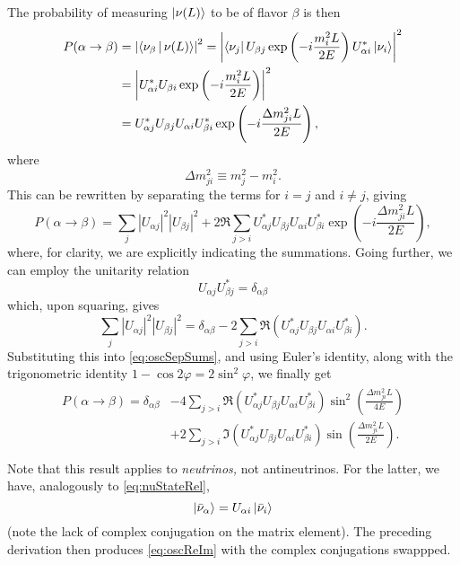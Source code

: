 \documentclass[../thesis.tex]{subfiles}
\begin{document}
The probability of measuring $\ket{\nu(L)}$ to be of flavor $\beta$ is then
\begin{align*}
  P(\alpha \rightarrow \beta)
  &= \left|\Braket{\nu_\beta|\nu(L)}\right|^2
    = \left| \Bra{\nu_j} U_{\beta j} \exp\left( -i\frac{m_i^2L}{2E} \right) U^*_{\alpha i}\Ket{\nu_i}\right|^2 \\
  &=  \left| U^*_{\alpha i} U_{\beta i} \exp\left( -i \frac{m_i^2L}{2E} \right)\right|^2 \\
  &= U^*_{\alpha j} U_{\beta j} U_{\alpha i} U^*_{\beta i} \exp\left( -i \frac{\Delta m^2_{ji}L}{2E} \right),
\end{align*}
where
\begin{equation}
  \Delta m^2_{ji} \equiv m^2_j - m^2_i.
\end{equation}
This can be rewritten by separating the terms for \(i = j\) and \(i \neq j\), giving
\begin{equation}
  \label{eq:oscSepSums}
  P(\alpha \rightarrow \beta) = \sum_{j} |U_{\alpha j}|^2 |U_{\beta j}|^2
  + 2 \Re \sum_{j>i} U^*_{\alpha j} U_{\beta j} U_{\alpha i} U^*_{\beta i}
  \exp\left( -i \frac{\Delta m^2_{ji}L}{2E} \right),
\end{equation}
where, for clarity, we are explicitly indicating the summations. Going further, we can employ the unitarity relation
\begin{equation}
  U_{\alpha j} U^*_{\beta j} = \delta_{\alpha \beta}
\end{equation}
which, upon squaring, gives
\begin{equation}
  \sum_j |U_{\alpha j}|^2 |U_{\beta j}|^2 = \delta_{\alpha \beta}
  - 2 \sum_{j > i} \Re(U^*_{\alpha j} U_{\beta j} U_{\alpha i} U^*_{\beta i}).
\end{equation}
Substituting this into \eqref{eq:oscSepSums}, and using Euler's identity, along with the trigonometric identity \(1 - \cos 2\varphi = 2\sin^2 \varphi\), we finally get
\begin{align}
  \label{eq:oscReIm}
  \begin{split}
    P(\alpha \rightarrow \beta) = \delta_{\alpha \beta} &- 4\sum_{j > i} \Re(U^*_{\alpha j} U_{\beta j} U_{\alpha i} U^*_{\beta i})
    \sin^2 \left( \frac{\Delta m^2_{ji}L}{4E} \right) \\
    &+ 2\sum_{j > i} \Im(U^*_{\alpha j} U_{\beta j} U_{\alpha i} U^*_{\beta i})
    \sin \left( \frac{\Delta m^2_{ji}L}{2E} \right). \\
  \end{split}
\end{align}
Note that this result applies to \emph{neutrinos,} not antineutrinos. For the latter, we have, analogously to \eqref{eq:nuStateRel},
\begin{equation}
  \ket{\bar\nu_\alpha} = U_{\alpha i}\ket{\bar\nu_i}
\end{equation}
(note the lack of complex conjugation on the matrix element). The preceding derivation then produces \eqref{eq:oscReIm} with the complex conjugations swappped.
\end{document}
